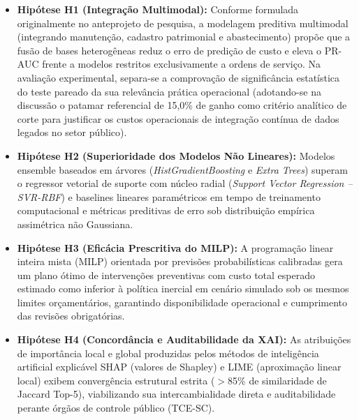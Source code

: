 \begin{itemize}
    \item \textbf{Hipótese H1 (Integração Multimodal):} Conforme formulada originalmente no anteprojeto de pesquisa, a modelagem preditiva multimodal (integrando manutenção, cadastro patrimonial e abastecimento) propõe que a fusão de bases heterogêneas reduz o erro de predição de custo e eleva o PR-AUC frente a modelos restritos exclusivamente a ordens de serviço. Na avaliação experimental, separa-se a comprovação de significância estatística do teste pareado da sua relevância prática operacional (adotando-se na discussão o patamar referencial de 15,0\% de ganho como critério analítico de corte para justificar os custos operacionais de integração contínua de dados legados no setor público).
    
    \item \textbf{Hipótese H2 (Superioridade dos Modelos Não Lineares):} Modelos ensemble baseados em árvores (\textit{HistGradientBoosting} e \textit{Extra Trees}) superam o regressor vetorial de suporte com núcleo radial (\textit{Support Vector Regression -- SVR-RBF}) e baselines lineares paramétricos em tempo de treinamento computacional e métricas preditivas de erro sob distribuição empírica assimétrica não Gaussiana.
    
    \item \textbf{Hipótese H3 (Eficácia Prescritiva do MILP):} A programação linear inteira mista (MILP) orientada por previsões probabilísticas calibradas gera um plano ótimo de intervenções preventivas com custo total esperado estimado como inferior à política inercial em cenário simulado sob os mesmos limites orçamentários, garantindo disponibilidade operacional e cumprimento das revisões obrigatórias.
    
    \item \textbf{Hipótese H4 (Concordância e Auditabilidade da XAI):} As atribuições de importância local e global produzidas pelos métodos de inteligência artificial explicável SHAP (valores de Shapley) e LIME (aproximação linear local) exibem convergência estrutural estrita ($>$85\% de similaridade de Jaccard Top-5), viabilizando sua intercambialidade direta e auditabilidade perante órgãos de controle público (TCE-SC).
\end{itemize}
